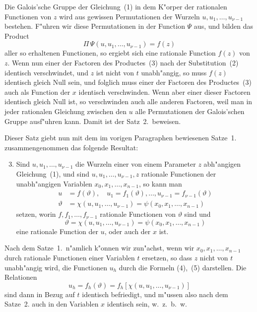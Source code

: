 \documentclass[12pt,a4paper]{article}
\theoremstyle{plain}
\begin{document}
Die Galois'sche Gruppe der Gleichung~(1) in dem K"orper der rationalen Functionen von $z$ wird aus gewissen Permutationen der Wurzeln $u, u_1, \ldots, u_{\nu-1}$ bestehen. F"uhren wir diese Permutationen in der Function $\Psi$ aus, und bilden das Product
\begin{equation}\tag{3}
\Pi\,\Psi(u, u_1, \ldots, u_{\nu-1}) = f(z)
\end{equation}
aller so erhaltenen Functionen, so ergiebt sich eine rationale Function $f(z)$ von $z$. Wenn nun einer der Factoren des Productes~(3) nach der Substitution~(2) identisch verschwindet, und $z$ ist nicht von $t$ unabh"angig, so muss $f(z)$ identisch gleich Null sein, und folglich muss einer der Factoren des Productes~(3) auch als Function der $x$ identisch verschwinden. Wenn aber einer dieser Factoren identisch gleich Null ist, so verschwinden auch alle anderen Factoren, weil man in jeder rationalen Gleichung zwischen den $u$ alle Permutationen der Galois'schen Gruppe ausf"uhren kann. Damit ist der Satz~2.~beweisen.

Dieser Satz giebt nun mit dem im vorigen Paragraphen bewiesenen Satze~1. zusammengenommen das folgende Resultat:

\begin{enumerate}[label=\arabic*.]
\setcounter{enumi}{2}
\item Sind $u, u_1, \ldots, u_{\nu-1}$ die Wurzeln einer von einem Parameter $z$ abh"angigen Gleichung~(1), und sind $u, u_1, \ldots, u_{\nu-1}, z$ rationale Functionen der unabh"angigen Variablen $x_0, x_1, \ldots, x_{n-1}$, so kann man
\begin{align*}
u &= f(\vartheta), \quad u_1 = f_1(\vartheta), \ldots, u_{\nu-1} = f_{\nu-1}(\vartheta) \tag{4}\\
\vartheta &= \chi(u, u_1, \ldots, u_{\nu-1}) = \psi(x_0, x_1, \ldots, x_{n-1}) \tag{5}
\end{align*}
setzen, worin $f, f_1, \ldots, f_{\nu-1}$ rationale Functionen von $\vartheta$ sind und
\[\vartheta = \chi(u, u_1, \ldots, u_{\nu-1}) = \psi(x_0, x_1, \ldots, x_{n-1})\]
eine rationale Function der $u$, oder auch der $x$ ist.
\end{enumerate}

Nach dem Satze~1.~n"amlich k"onnen wir zun"achst, wenn wir $x_0, x_1, \ldots, x_{n-1}$ durch rationale Functionen einer Variablen $t$ ersetzen, so dass $z$ nicht von $t$ unabh"angig wird, die Functionen $u_h$ durch die Formeln (4),~(5) darstellen. Die Relationen
\[u_h = f_h(\vartheta) = f_h[\chi(u, u_1, \ldots, u_{\nu-1})]\]
sind dann in Bezug auf $t$ identisch befriedigt, und m"ussen also nach dem Satze~2. auch in den Variablen $x$ identisch sein, w.~z.~b.~w.
\end{document}
